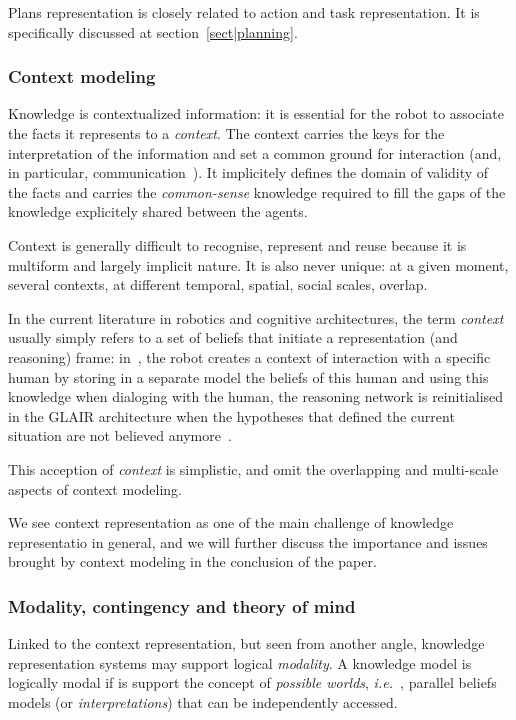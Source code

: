 \documentclass[a4paper, twocolumn]{article}
\newcommand{\ie}{{\textit{i.e.\ }}}
\begin{document}
Plans representation is closely related to action and task representation. It
is specifically discussed at section~\ref{sect|planning}.

\subsubsection{Context modeling}

Knowledge is contextualized information: it is essential for the robot to
associate the facts it represents to a \emph{context}. The context carries the
keys for the interpretation of the information and set a common ground for
interaction (and, in particular, communication~\cite{Jakobson1960}). It
implicitely defines the domain of validity of the facts and carries the
\emph{common-sense} knowledge required to fill the gaps of the knowledge
explicitely shared between the agents.

Context is generally difficult to recognise, represent and reuse because it is
multiform and largely implicit nature. It is also never unique: at a given
moment, several contexts, at different temporal, spatial, social scales,
overlap.

In the current literature in robotics and cognitive architectures, the term
\emph{context} usually simply refers to a set of beliefs that initiate a
representation (and reasoning) frame: in~\cite{Lemaignan2011a}, the robot
creates a context of interaction with a specific human by storing in a separate
model the beliefs of this human and using this knowledge when dialoging with
the human, the reasoning network is reinitialised in the GLAIR architecture
when the hypotheses that defined the current situation are not believed
anymore~\cite{Shapiro2009}.

This acception of \emph{context} is simplistic, and omit the overlapping and
multi-scale aspects of context modeling.

We see context representation as one of the main challenge of knowledge
representatio in general, and we will further discuss the importance and issues
brought by context modeling in the conclusion of the paper.

\subsubsection{Modality, contingency and theory of mind}
\label{sect|possible-worlds}

Linked to the context representation, but seen from another angle, knowledge
representation systems may support logical \emph{modality}. A knowledge model
is logically modal if is support the concept of \emph{possible worlds}, \ie,
parallel beliefs models (or \emph{interpretations}) that can be independently
accessed.
\end{document}
